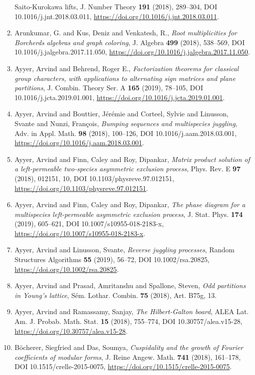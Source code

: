 \begin{enumerate}
{{S}aito-{K}urokawa lifts}, J. Number Theory {\bf 191} (2018), 289--304, DOI 10.1016/j.jnt.2018.03.011, \url{https://doi.org/10.1016/j.jnt.2018.03.011}.
\item Arunkumar, G. and Kus, Deniz and Venkatesh, R., {\em Root multiplicities for {B}orcherds algebras and graph
coloring}, J. Algebra {\bf 499} (2018), 538--569, DOI 10.1016/j.jalgebra.2017.11.050, \url{https://doi.org/10.1016/j.jalgebra.2017.11.050}.
\item Ayyer, Arvind and Behrend, Roger E., {\em Factorization theorems for classical group characters, with
applications to alternating sign matrices and plane
partitions}, J. Combin. Theory Ser. A {\bf 165} (2019), 78--105, DOI 10.1016/j.jcta.2019.01.001, \url{https://doi.org/10.1016/j.jcta.2019.01.001}.
\item Ayyer, Arvind and Bouttier, J\'{e}r\'{e}mie and Corteel, Sylvie and
Linusson, Svante and Nunzi, Fran\c{c}ois, {\em Bumping sequences and multispecies juggling}, Adv. in Appl. Math. {\bf 98} (2018), 100--126, DOI 10.1016/j.aam.2018.03.001, \url{https://doi.org/10.1016/j.aam.2018.03.001}.
\item Ayyer, Arvind and Finn, Caley and Roy, Dipankar, {\em Matrix product solution of a left-permeable two-species
asymmetric exclusion process}, Phys. Rev. E {\bf 97} (2018), 012151, 10, DOI 10.1103/physreve.97.012151, \url{https://doi.org/10.1103/physreve.97.012151}.
\item Ayyer, Arvind and Finn, Caley and Roy, Dipankar, {\em The phase diagram for a multispecies left-permeable asymmetric
exclusion process}, J. Stat. Phys. {\bf 174} (2019), 605--621, DOI 10.1007/s10955-018-2183-x, \url{https://doi.org/10.1007/s10955-018-2183-x}.
\item Ayyer, Arvind and Linusson, Svante, {\em Reverse juggling processes}, Random Structures Algorithms {\bf 55} (2019), 56--72, DOI 10.1002/rsa.20825, \url{https://doi.org/10.1002/rsa.20825}.
\item Ayyer, Arvind and Prasad, Amritanshu and Spallone, Steven, {\em Odd partitions in {Y}oung's lattice}, S\'{e}m. Lothar. Combin. {\bf 75} (2018), Art. B75g, 13.
\item Ayyer, Arvind and Ramassamy, Sanjay, {\em The {H}ilbert-{G}alton board}, ALEA Lat. Am. J. Probab. Math. Stat. {\bf 15} (2018), 755--774, DOI 10.30757/alea.v15-28, \url{https://doi.org/10.30757/alea.v15-28}.
\item B\"{o}cherer, Siegfried and Das, Soumya, {\em Cuspidality and the growth of {F}ourier coefficients of
modular forms}, J. Reine Angew. Math. {\bf 741} (2018), 161--178, DOI 10.1515/crelle-2015-0075, \url{https://doi.org/10.1515/crelle-2015-0075}.

\end{enumerate}
